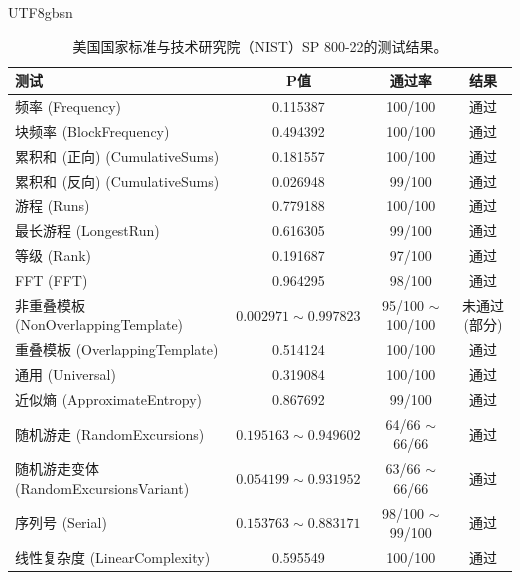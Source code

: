 \documentclass{article}
\begin{document}
\begin{CJK*}{UTF8}{gbsn}

\begin{table}[htbp]
\centering
\caption{美国国家标准与技术研究院（NIST）SP 800-22的测试结果。}
\label{tab:nist_results}
\begin{tabular}{lccc}
\toprule
\textbf{测试} & \textbf{P值} & \textbf{通过率} & \textbf{结果} \\
\midrule
频率 (Frequency) & 0.115387 & 100/100 & 通过 \\
块频率 (BlockFrequency) & 0.494392 & 100/100 & 通过 \\
累积和 (正向) (CumulativeSums) & 0.181557 & 100/100 & 通过 \\
累积和 (反向) (CumulativeSums) & 0.026948 & 99/100 & 通过 \\
游程 (Runs) & 0.779188 & 100/100 & 通过 \\
最长游程 (LongestRun) & 0.616305 & 99/100 & 通过 \\
等级 (Rank) & 0.191687 & 97/100 & 通过 \\
FFT (FFT) & 0.964295 & 98/100 & 通过 \\
非重叠模板 (NonOverlappingTemplate) & $0.002971 \sim 0.997823$ & 95/100 $\sim$ 100/100 & 未通过 (部分) \\
重叠模板 (OverlappingTemplate) & 0.514124 & 100/100 & 通过 \\
通用 (Universal) & 0.319084 & 100/100 & 通过 \\
近似熵 (ApproximateEntropy) & 0.867692 & 99/100 & 通过 \\
随机游走 (RandomExcursions) & $0.195163 \sim 0.949602$ & 64/66 $\sim$ 66/66 & 通过 \\
随机游走变体 (RandomExcursionsVariant) & $0.054199 \sim 0.931952$ & 63/66 $\sim$ 66/66 & 通过 \\
序列号 (Serial) & $0.153763 \sim 0.883171$ & 98/100 $\sim$ 99/100 & 通过 \\
线性复杂度 (LinearComplexity) & 0.595549 & 100/100 & 通过 \\
\bottomrule
\end{tabular}
\end{table}

\end{CJK*}
\end{document}
